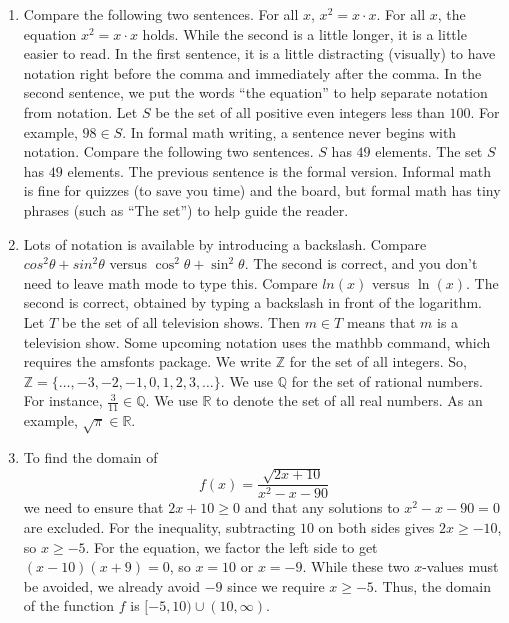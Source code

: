 \documentclass{article}
\begin{document}
\begin{enumerate}
\newpage

\item 
Compare the following two sentences. For all $x$, $x^2=x \cdot x$. For all $x$, the equation $x^2=x \cdot x$ holds. While the second is a little longer, it is a little easier to read. In the first sentence, it is a little distracting (visually) to have notation right before the comma and immediately after the comma. In the second sentence, we put the words ``the equation'' to help separate notation from notation. Let $S$ be the set of all positive even integers less than $100$. For example, $98 \in S$. In formal math writing, a sentence never begins with notation. Compare the following two sentences. $S$ has $49$ elements. The set $S$ has $49$ elements. The previous sentence is the formal version. Informal math is fine for quizzes (to save you time) and the board, but formal math has tiny phrases (such as ``The set'') to help guide the reader.

\newpage

\item Lots of notation is available by introducing a backslash. Compare $cos^2\theta+sin^2\theta$ versus $\cos^2\theta+\sin^2\theta$. The second is correct, and you don't need to leave math mode to type this. Compare $ln(x)$ versus $\ln(x)$. The second is correct, obtained by typing a backslash in front of the logarithm. Let $T$ be the set of all television shows. Then $m \in T$ means that $m$ is a television show. Some upcoming notation uses the mathbb command, which requires the amsfonts package. We write $\mathbb{Z}$ for the set of all integers. So, $\mathbb{Z}=\{\dots,-3,-2,-1,0,1,2,3,\dots\}$. We use $\mathbb{Q}$ for the set of rational numbers. For instance, $\frac{3}{11} \in \mathbb{Q}$. We use $\mathbb{R}$ to denote the set of all real numbers. As an example, $\sqrt{\pi} \in \mathbb{R}$.

\newpage

\item To find the domain of 
\[ f(x) = \frac{\sqrt{2x+10}}{x^2-x-90}\]
we need to ensure that $2x + 10 \geq 0$ and that any solutions to $x^2-x-90=0$ are excluded. For the inequality, subtracting $10$ on both sides gives $2x \geq -10$, so $x \geq -5$. For the equation, we factor the left side to get $(x-10)(x+9)=0$, so $x=10$ or $x=-9$. While these two $x$-values must be avoided, we already avoid $-9$ since we require $x \geq -5$. Thus, the domain of the function $f$ is $[-5,10) \cup (10,\infty)$.

\end{enumerate}
\end{document}
